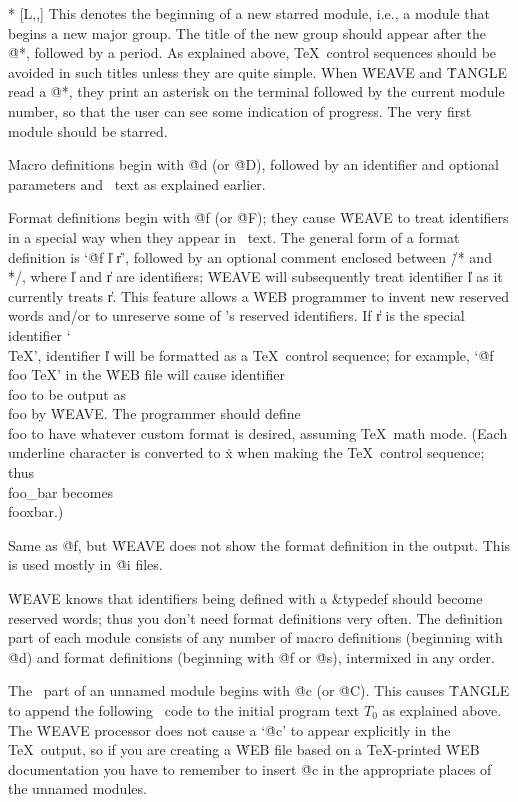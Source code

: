 \@* [\overline L,\oP,\oT] This denotes the beginning of a new starred
module, i.e., a module that begins a new major group. The title of the new
group should appear after the \.{@*}, followed by a period. As explained
above, \TeX\ control sequences should be avoided in such titles unless
they are quite simple. When \.{WEAVE} and \.{TANGLE} read a \.{@*}, they
print an asterisk on the terminal
followed by the current module number, so that the user
can see some indication of progress. The very first module should be starred.

\@d [\oP,\oT] Macro definitions begin with \.{@d} (or \.{@D}), followed by
an identifier and optional parameters and \Cee\ text as explained earlier.

\@f [\oP,\oT] Format definitions begin with \.{@f} (or \.{@F}); they cause
\.{WEAVE} to treat identifiers in a special way when they appear in
\Cee\ text. The general form of a format definition is `\.{@f} \|l
\|r', followed by an optional comment enclosed between
\.{/*} and \.{*/}, where \|l and \|r
are identifiers; \.{WEAVE} will subsequently treat identifier \|l as it
currently treats \|r. This feature allows a \.{WEB} programmer to invent
new reserved words and/or to unreserve some of \Cee's reserved
identifiers. If \|r is the special identifier `\\{TeX}', identifier \|l
will be formatted as a \TeX\ control sequence; for example,
`\.{@f foo TeX}' in the \.{WEB} file will cause identifier \\{foo} to
be output as \.{\\foo} by \.{WEAVE}. The programmer should define
\.{\\foo} to have whatever custom format is desired, assuming \TeX\
math mode. (Each underline
character is converted to \.{x} when making the \TeX\ control sequence;
thus \\{foo\_bar} becomes \.{\\fooxbar}.)

\@s [\oP,\oT] Same as \.{@f}, but \.{WEAVE} does not show the format
definition in the output. This is used mostly in \.{@i} files.

\more \.{WEAVE} knows that identifiers being
defined with a \&{typedef} should become reserved words; thus you
don't need format definitions very often.
The definition part of each module consists of any number of
macro definitions (beginning with \.{@d}) and format definitions (beginning
with \.{@f} or \.{@s}), intermixed in any order.

\@c [\oP,\oT] The \Cee\ part of an unnamed module begins with \.{@c}
(or \.{@C}). This causes \.{TANGLE} to append the following \Cee\ code
to the initial program text $T_0$ as explained above. The \.{WEAVE}
processor does not cause a `\.{@c}' to appear explicitly in the \TeX\
output, so if you are creating a \.{WEB} file based on a \TeX-printed
\.{WEB} documentation you have to remember to insert \.{@c} in the
appropriate places of the unnamed modules.

